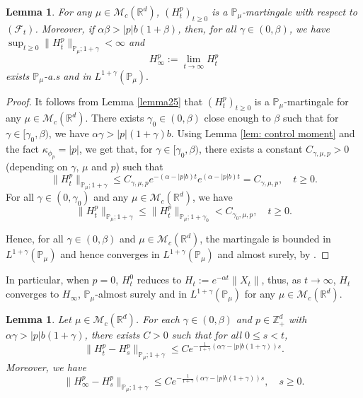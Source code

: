 \documentclass[12pt,a4paper]{amsart}
\theoremstyle{plain}
\newtheorem{lem}[thm]{Lemma}
\theoremstyle{definition}
\numberwithin{equation}{section}
\begin{document}
\begin{lem}\label{lemma26}
    For any $\mu\in \mathcal M_c(\mathbb R^d)$, $(H^p_t)_{t\geq 0}$ is a $\mathbb P_\mu$-martingale with respect to $(\mathscr F_t)$. Moreover, if $\alpha\beta>|p|b(1+\beta)$, then, for all $\gamma\in (0, \beta)$, we have $\sup_{t\geq 0}\|H_t^p\|_{\mathbb P_\mu;1+\gamma}< \infty$ and
\[
    H_{\infty}^p
    :=\lim_{t\rightarrow \infty}H_t^p
\]
    exists $\mathbb{P}_{\mu}$-a.s and in $L^{1+\gamma}(\mathbb{P}_{\mu}).$
\end{lem}
\begin{proof}
    It follows from Lemma \ref{lemma25} that $(H_t^p)_{t\geq 0}$ is a $\mathbb P_\mu$-martingale for any $\mu\in \mathcal M_c(\mathbb R^d)$.
    There exists $\gamma_0 \in (0,\beta)$ close enough to $\beta$ such that for $\gamma\in [\gamma_0, \beta)$, we have $\alpha\gamma>|p|(1+\gamma)b$.
    Using  Lemma \ref{lem: control moment} and the fact $\kappa_{\phi_p}=|p|$, we get that, for $\gamma\in [\gamma_0, \beta)$, there exists a constant $C_{\gamma, \mu, p}>0$ (depending on $\gamma$, $\mu$ and $p$) such that
\[
 	\|H_t^p\|_{\mathbb P_\mu;1+\gamma}
    \leq C_{\gamma, \mu, p} e^{-(\alpha-|p|b)t}e^{(\alpha-|p|b)t}
    =C_{\gamma, \mu, p}, \quad t\geq 0.
\]
    For all $\gamma\in (0, \gamma_0)$ and any $\mu\in \mathcal M_c(\mathbb R^d)$, we have
\[
	\|H_t^p\|_{\mathbb P_\mu;1+\gamma}
	\leq\|H_t^p\|_{\mathbb P_\mu;1+\gamma_0}
	<C_{\gamma_0, \mu, p},
	\quad t\geq 0.
\]

    Hence, for all $\gamma \in (0,\beta)$ and $\mu\in \mathcal M_c(\mathbb R^d)$, the martingale is bounded in $L^{1+\gamma}(\mathbb{P}_{\mu})$ and hence converges in $L^{1+\gamma}(\mathbb{P}_{\mu}) $ and almost surely, by \cite[Theorem 5.4.5]{Durrett2010Probability}.
\end{proof}

    In particular, when $p=0$, $H_t^0$ reduces to $H_t:=e^{-\alpha t}\|X_t\|$, thus, as $t\rightarrow \infty$, $H_t$ converges to $H_{\infty}$, $\mathbb{P}_{\mu}$-almost surely and in $L^{1+\gamma}(\mathbb{P}_{\mu})$  for any $\mu\in \mathcal M_c(\mathbb R^d)$.

\begin{lem}\label{lem: control of wt}
    Let $\mu\in \mathcal M_c(\mathbb R^d)$. 
    For each $\gamma\in (0,\beta)$ and $p\in \mathbb{Z}_+^d$ with $\alpha \gamma > |p|b(1+\gamma)$, there exists $C> 0$ such that for all $0\leq s<t$,
\[
    \|H^p_t-H^p_s\|_{\mathbb{P}_{\mu};1+\gamma}
    \leq C e^{-\frac{ 1}{1+\gamma}(\alpha\gamma-|p|b(1+\gamma))s}.
\]
    Moreover, we have
\[
    \|H^p_\infty-H^p_s\|_{\mathbb{P}_{\mu};1+\gamma}
    \leq C e^{-\frac{ 1}{1+\gamma}(\alpha\gamma-|p|b(1+\gamma))s},\quad s\geq 0.
\]
\end{lem}
\end{document}
